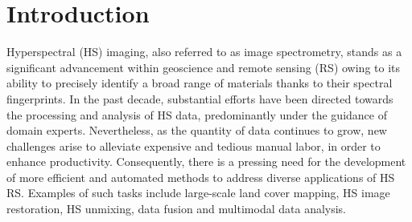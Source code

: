 
\chapter{Introduction}
\label{ch:intro}

\chead[\fancyplain{}{}]
      {\fancyplain{}{}}
\lfoot[\fancyplain{}{}]%
      {\fancyplain{}{}}
\cfoot[\fancyplain{}{\thepage}]
      {\fancyplain{}{\thepage}}
\rfoot[\fancyplain{}{}]%
     {\fancyplain{}{\scriptsize}}
     


\minitoc
\newpage

Hyperspectral (HS) imaging, also referred to as image spectrometry, stands as a significant advancement within geoscience and remote sensing (RS) owing to its ability to precisely identify a broad range of materials thanks to their spectral fingerprints.
In the past decade, substantial efforts have been directed towards the processing and analysis of HS data, predominantly under the guidance of domain experts.
Nevertheless, as the quantity of data continues to grow, new challenges arise to alleviate expensive and tedious manual labor, in order to enhance productivity.
Consequently, there is a pressing need for the development of more efficient and automated methods to address diverse applications of HS RS.
Examples of such tasks include large-scale land cover mapping, HS image restoration, HS unmixing, data fusion and multimodal data analysis.

